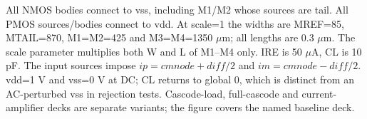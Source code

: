 \par
All NMOS bodies connect to vss, including M1/M2 whose sources are tail. All PMOS sources/bodies connect to vdd. At scale=1 the widths are MREF=85, MTAIL=870, M1=M2=425 and M3=M4=1350 $\mu$m; all lengths are 0.3 $\mu$m. The scale parameter multiplies both W and L of M1--M4 only. IRE is 50 $\mu$A, CL is 10 pF. The input sources impose $ip=cmnode+diff/2$ and $im=cmnode-diff/2$. vdd=1 V and vss=0 V at DC; CL returns to global 0, which is distinct from an AC-perturbed vss in rejection tests. Cascode-load, full-cascode and current-amplifier decks are separate variants; the figure covers the named baseline deck.
